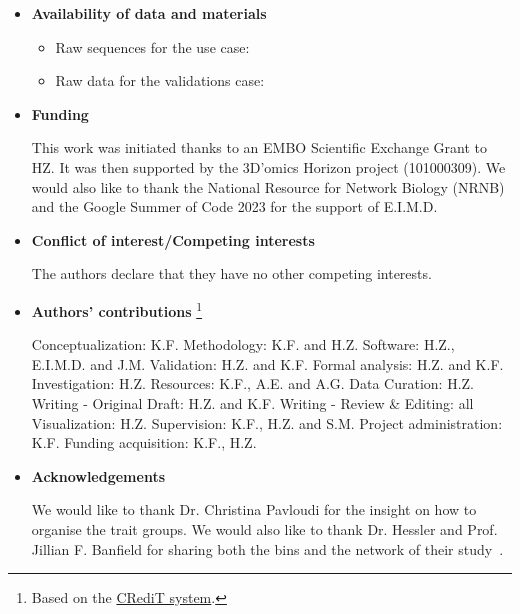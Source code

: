\documentclass[sn-mathphys,Numbered]{sn-jnl}  %
\theoremstyle{thmstyleone}%
\theoremstyle{thmstyletwo}%
\theoremstyle{thmstylethree}%
\begin{document}
    \begin{itemize}

        \item \textbf{Availability of data and materials}

            \begin{itemize}
                \item Raw sequences for the use case: 
                \item Raw data for the validations case:
            \end{itemize}

        \item \textbf{Funding}
        
            This work was initiated thanks to an EMBO Scientific Exchange Grant to HZ. 
            It was then supported by the 3D’omics Horizon project (101000309). 
            We would also like to thank the National Resource for Network Biology (NRNB) and the Google Summer of Code 2023 for the support of E.I.M.D.

        \item \textbf{Conflict of interest/Competing interests} 

            The authors declare that they have no other competing interests.

        \item \textbf{Authors' contributions}
            \footnote{Based on the \href{https://www-elsevier-com.kuleuven.e-bronnen.be/researcher/author/policies-and-guidelines/credit-author-statement}{CRediT system}.}

            Conceptualization: K.F.
            Methodology: K.F. and H.Z.
            Software: H.Z., E.I.M.D. and J.M.
            Validation: H.Z. and K.F.
            Formal analysis: H.Z. and K.F.
            Investigation: H.Z.
            Resources: K.F., A.E. and A.G.
            Data Curation: H.Z.
            Writing - Original Draft: H.Z. and K.F. 
            Writing - Review \& Editing: all
            Visualization: H.Z.
            Supervision: K.F., H.Z. and S.M.
            Project administration: K.F.
            Funding acquisition: K.F., H.Z.


        \item \textbf{Acknowledgements}

            We would like to thank Dr. Christina Pavloudi for the insight on how to organise the trait groups.
            We would also like to thank Dr. Hessler and Prof. Jillian F. Banfield for sharing both the bins and the network of their study~\cite{hessler2023vitamin}. 



\end{itemize}
\end{document}
